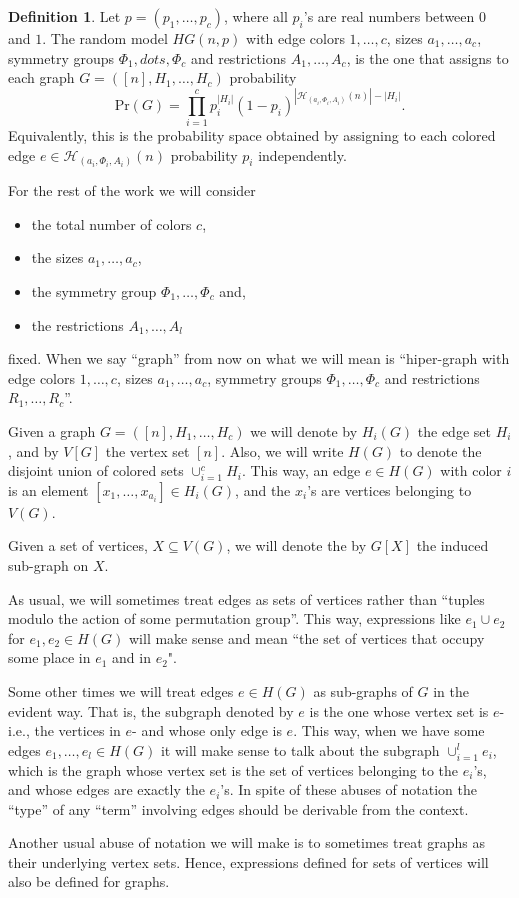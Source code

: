 \documentclass[11pt,notitlepage,a4paper]{article}
\theoremstyle{definition}
\newtheorem{definition}{Definition}[section]
\begin{document}
\begin{definition} 
	Let $p=(p_1,\dots, p_c)$, where all $p_i$'s are real numbers
	between $0$ and $1$. 
	The random model $HG(n,p)$ with edge colors $1,\dots,c$,
	sizes $a_1,\dots,a_c$, 
	symmetry groups $\Phi_1,dots,\Phi_c$ 
	and restrictions $A_1,\dots,A_c$, is the one that
	assigns to each graph $G=([n], H_1,\dots, H_c)$
	probability
	\[ \mathrm{Pr}(G)=\prod_{i=1}^{c} p_i^{|H_i|}(1-p_i)^{|\mathcal{H}_{(a_i,\Phi_i,A_i)}(n)|-|H_i|}.	
	\]
	Equivalently, this is the probability space obtained by 
	assigning to each colored edge 
	$e\in \mathcal{H}_{(a_i,\Phi_i,A_i)}(n)$ probability $p_i$ independently. 
\end{definition}

For the rest of the work we will consider 
\begin{itemize}
	\item the total number of colors $c$,	
	\item the sizes $a_1,\dots,a_c$,
	\item the symmetry group $\Phi_1,\dots, \Phi_c$ and,
	\item the restrictions $A_1,\dots,A_l$
\end{itemize}
fixed. When we say ``graph'' from now on what
we will mean is ``hiper-graph with edge colors 
$1,\dots, c$, sizes $a_1,\dots,a_c$, 
symmetry groups $\Phi_1,\dots,\Phi_c$ and 
restrictions $R_1,\dots,R_c$''. \par

Given a graph $G=([n], H_1,\dots, H_c)$ we will denote by
$H_i(G)$ the edge set $H_i$, and by $V[G]$ the vertex set
$[n]$. Also, we will write $H(G)$ to denote the 
disjoint union of colored sets $\cup_{i=1}^c H_i$.
This way, an edge $e\in H(G)$ with color $i$ is an element
$[x_1,\dots,x_{a_i}]\in H_i(G)$, and the $x_i$'s are vertices
belonging to $V(G)$. \par
Given a set of vertices, $X\subseteq V(G)$, we will denote
the by $G[X]$ the induced sub-graph on $X$. \par
As usual, we will sometimes treat edges as sets of vertices
rather than ``tuples modulo the action of some permutation group''. 
This way, expressions like $e_1\cup e_2$ for $e_1, e_2\in H(G)$
will make sense and mean 
``the set of vertices that occupy some place in $e_1$ 
and in $e_2$".\par
Some other times we will treat edges $e\in H(G)$
as sub-graphs of $G$ in the evident way. That is, the subgraph
denoted by $e$ is the one whose vertex set is $e$-i.e., the vertices in $e$-
and whose only edge is $e$. 
This way, when we have some edges $e_1,\dots, e_l\in H(G)$ 
it will make sense to talk
about the subgraph $\cup_{i=1}^l e_i$, which is the graph
whose vertex set is the set of vertices belonging to the $e_i$'s, 
and whose edges are exactly the $e_i$'s. In spite of these
abuses of notation the ``type'' of any ``term'' involving edges 
should be derivable from the context. \par
Another usual abuse of notation we will make is to sometimes
treat graphs as their underlying vertex sets. Hence,
expressions defined for sets of vertices will also be defined 
for graphs. 
\end{document}
